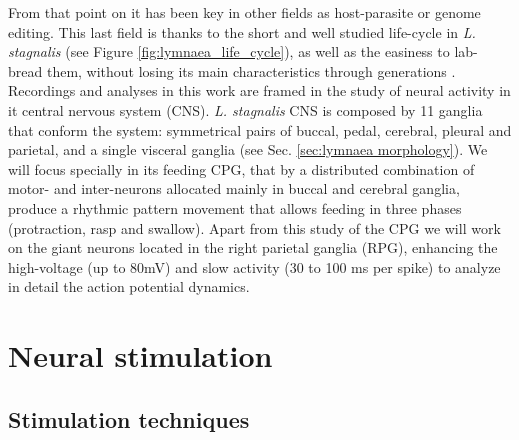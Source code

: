  From that point on it has been key in other fields as host-parasite or genome editing. This last field is thanks to the short and well studied life-cycle in \textit{L. stagnalis} (see Figure \ref{fig:lymnaea_life_cycle}), as well as the easiness to lab-bread them, without losing its main characteristics through generations \parencite{noland_observations_1946}. Recordings and analyses in this work are framed in the study of neural activity in it central nervous system (CNS). \textit{L. stagnalis} CNS is composed by 11 ganglia that conform the system: symmetrical pairs of buccal, pedal, cerebral, pleural and parietal, and a single visceral ganglia (see Sec. \ref{sec:lymnaea morphology}). We will focus specially in its feeding CPG, that by a distributed combination of motor- and inter-neurons allocated mainly in buccal and cerebral ganglia, produce a rhythmic pattern movement that allows feeding in three phases (protraction, rasp and swallow). Apart from this study of the CPG we will work on the giant neurons located in the right parietal ganglia (RPG), enhancing the high-voltage (up to 80mV) and slow activity (30 to 100 ms per spike) to analyze in detail the action potential dynamics. 


\section{Neural stimulation}
\subsection{Stimulation techniques}

